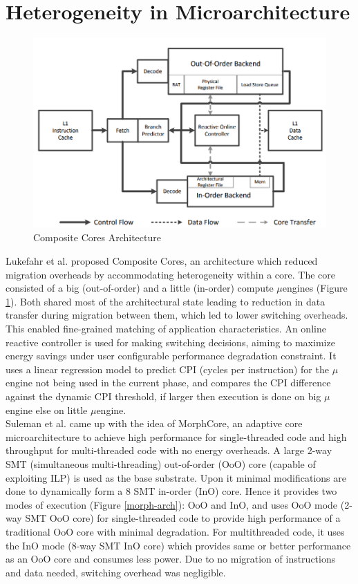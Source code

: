 \documentclass[a4paper,12pt, final]{report}
\begin{document}
\section{Heterogeneity in Microarchitecture}
\begin{figure}[H]
    \centering
    \includegraphics[width=0.5\linewidth]{composite-cores-arch.png}
    \caption{Composite Cores Architecture}
    \label{composite-arch}
\end{figure}
Lukefahr et al. \cite{lukefahr2012composite} proposed Composite Cores, an architecture which reduced migration overheads by accommodating heterogeneity within a core. The core consisted of a big (out-of-order) and a little (in-order) compute $\mu$engines (Figure \ref{composite-arch}). Both shared most of the architectural state leading to reduction in data transfer during migration between them, which led to lower switching overheads. This enabled fine-grained matching of application characteristics. An online reactive controller is used for making switching decisions, aiming to maximize energy savings under user configurable performance degradation constraint. It uses a linear regression model to predict CPI (cycles per instruction) for the $\mu$engine not being used in the current phase, and compares the CPI difference against the dynamic CPI threshold, if larger then execution is done on big $\mu$engine else on little $\mu$engine. %
\\
\indent Suleman et al. \cite{suleman2012morphcore} came up with the idea of MorphCore, an adaptive core microarchitecture to achieve high performance for single-threaded code and high throughput for multi-threaded code with no energy overheads. A large 2-way SMT (simultaneous multi-threading) out-of-order (OoO) core (capable of exploiting ILP) is used as the base substrate. Upon it minimal modifications are done to dynamically form a 8 SMT in-order (InO) core. Hence it provides two modes of execution (Figure \ref{morph-arch}): OoO and InO, and uses OoO mode (2-way SMT OoO core) for single-threaded code to provide high performance of a traditional OoO core with minimal degradation. For multithreaded code, it uses the InO mode (8-way SMT InO core) which provides same or better performance as an OoO core \cite{hily1999} and consumes less power. Due to no migration of instructions and data needed, switching overhead was negligible. %
\end{document}
